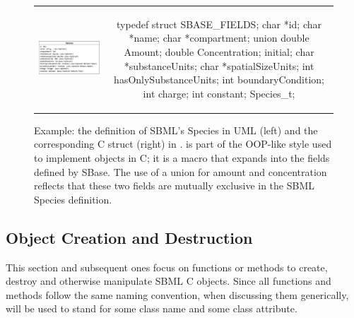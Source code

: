 \documentclass{sbmlmanual}
\begin{document}
\begin{figure}[bht]
  \begin{tabular}{m{8.7cm}c}
    \includegraphics[scale=0.67]{graphics/species}
    &
    \begin{cVerbatim}
typedef struct
{
  SBASE_FIELDS;
  char   *id;
  char   *name;
  char   *compartment;
  union
  {
    double Amount;
    double Concentration;
  } initial;
  char   *substanceUnits;
  char   *spatialSizeUnits;
  int     hasOnlySubstanceUnits;
  int     boundaryCondition;
  int     charge;
  int     constant;
} Species_t;
    \end{cVerbatim}\\
  \end{tabular}
  \caption{Example: the definition of SBML's Species in UML (left) and the
    corresponding  C struct (right) in \libsbml{}.
     is part of the OOP-like style used to implement
    objects in C; it is a macro that expands into the fields defined by
    SBase.  The use of a union for amount and concentration reflects that
    these two fields are mutually exclusive in the SBML Species
    definition.}
  \label{fig:species-uml-and-c}
\end{figure}



\subsection{Object Creation and Destruction}

This section and subsequent ones focus on functions or methods to
create, destroy and otherwise manipulate SBML C objects.  Since all
functions and methods follow the same naming convention, when
discussing them generically,  will be used to stand for
some class name and  some class attribute.
\end{document}
